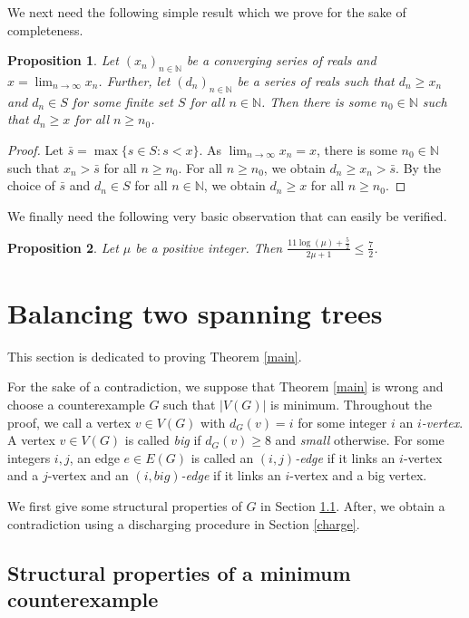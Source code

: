 \documentclass{article}
\theoremstyle{plain}
\newtheorem{Proposition}{Proposition}
\theoremstyle{nonumberplain}
\theoremstyle{nonumberplain}
\begin{document}
We next  need the following simple result which we prove for the sake of completeness.
\begin{Proposition}\label{ddaqd}
Let $(x_n)_{n \in \mathbb{N}}$ be a converging series of reals and $x=\lim_{n \rightarrow \infty}x_n$. Further, let $(d_n)_{n \in \mathbb{N}}$ be a series of reals such that $d_n \geq x_n$ and $d_n \in S$ for some finite set $S$ for all $n \in \mathbb{N}$. Then there is some $n_0 \in \mathbb{N}$ such that $d_n \geq x$ for all $n \geq n_0$.
\end{Proposition}
\begin{proof}
Let $\bar{s}=\max\{s \in S:s<x\}$. As $\lim_{n \rightarrow \infty}x_n=x$, there is some $n_0 \in \mathbb{N}$ such that $x_n > \bar{s}$ for all $n \geq n_0$. For all $n \geq n_0$, we obtain $d_n\geq x_n > \bar{s}$. By the choice of $\bar{s}$ and $d_n \in S$ for all $n \in \mathbb{N}$, we obtain $d_n \geq x$ for all $n \geq n_0$.
\end{proof}
We finally need the following very basic observation that can easily be verified.
\begin{Proposition}\label{loga}
Let $\mu$ be a positive integer. Then $\frac{11 \log (\mu)+\frac{5}{2}}{2 \mu +1}\leq \frac{7}{2}$.
\end{Proposition}
\section{Balancing two spanning trees}\label{alt}

This section is dedicated to proving Theorem \ref{main}.
\medskip

 For the sake of a contradiction, we suppose that Theorem \ref{main} is wrong and choose a counterexample $G$ such that $|V(G)|$ is minimum. Throughout the proof, we call a vertex $v \in V(G)$ with $d_G(v)=i$ for some integer $i$ an {\it $i$-vertex}. A vertex $v \in V(G)$ is called {\it big} if $d_G(v)\geq 8$ and {\it small} otherwise. For some integers $i,j$, an edge $e \in E(G)$  is called an {\it $(i,j)$-edge} if it links an $i$-vertex and a $j$-vertex and an {\it $(i,big)$-edge} if it links an $i$-vertex and a big vertex.
\medskip

 We first give some structural properties of $G$ in Section \ref{struc}. After, we obtain a contradiction using a discharging procedure in Section \ref{charge}.

\subsection{Structural properties of a minimum counterexample}\label{struc}
\end{document}
